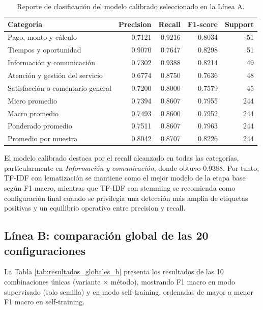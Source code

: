 \documentclass[12pt,a4paper]{article}
\begin{document}
\begin{table}[!htbp]
\centering
\caption{Reporte de clasificación del modelo calibrado seleccionado en la Línea A.}
\label{tab:reporte_modelo_calibrado_a}
\small
\begin{tabular}{lrrrr}
\toprule
\textbf{Categoría} & \textbf{Precision} & \textbf{Recall} & \textbf{F1-score} & \textbf{Support} \\
\midrule
Pago, monto y cálculo & 0.7121 & 0.9216 & 0.8034 & 51 \\
Tiempos y oportunidad & 0.9070 & 0.7647 & 0.8298 & 51 \\
Información y comunicación & 0.7302 & 0.9388 & 0.8214 & 49 \\
Atención y gestión del servicio & 0.6774 & 0.8750 & 0.7636 & 48 \\
Satisfacción o comentario general & 0.7200 & 0.8000 & 0.7579 & 45 \\
\midrule
Micro promedio & 0.7394 & 0.8607 & 0.7955 & 244 \\
Macro promedio & 0.7493 & 0.8600 & 0.7952 & 244 \\
Ponderado promedio & 0.7511 & 0.8607 & 0.7963 & 244 \\
Promedio por muestra & 0.8042 & 0.8707 & 0.8226 & 244 \\
\bottomrule
\end{tabular}
\end{table}
\FloatBarrier

El modelo calibrado destaca por el recall alcanzado en todas las categorías, particularmente en \textit{Información y comunicación}, donde obtuvo 0.9388. Por tanto, TF-IDF con lematización se mantiene como el mejor modelo de la etapa base según F1 macro, mientras que TF-IDF con stemming se recomienda como configuración final cuando se privilegia una detección más amplia de etiquetas positivas y un equilibrio operativo entre precision y recall.

\subsection{Línea B: comparación global de las 20 configuraciones}

La Tabla \ref{tab:resultados_globales_b} presenta los resultados de las 10 combinaciones únicas (variante × método), mostrando F1 macro en modo supervisado (solo semilla) y en modo self-training, ordenadas de mayor a menor F1 macro en self-training.
\end{document}
